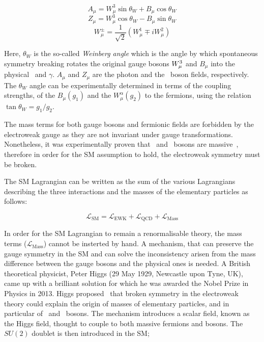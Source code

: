 			\begin{equation}
			\label{eq:photon}
				A_{\mu} = W_{\mu}^3 \sin\theta_W  + B_{\mu}\cos \theta_W 
			\end{equation}
			\begin{equation}
			\label{eq:Zboson}
				Z_{\mu} = W_{\mu}^3\cos\theta_W  - B_{\mu} \sin \theta_W
			\end{equation}
			\begin{equation}
			\label{eq:Wboson}
				W_{\mu}^\pm = \frac{1}{\sqrt{2}} \displaystyle \left ( W_{\mu}^1 \mp i W_{\mu}^2 \right )
			\end{equation}

			\noindent Here, $\theta_W$ is the so-called \emph{Weinberg angle} which is the angle by which spontaneous symmetry breaking rotates the original gauge bosons $W_{\mu}^3$ and $B_{\mu}$ into the physical \Zboson\ and $\gamma$. $A_\mu$ and $Z_\mu$ are the photon and the \Zboson\ boson fields, respectively. The $\theta_W$ angle can be experimentally determined in terms of the coupling strengths, of the $B_{\mu}(g_1)$ and the $W_{\mu}^\alpha (g_2)$ to the fermions, using the relation $\tan\theta_W = g_1 / g_2 $. 

			The mass terms for both gauge bosons and fermionic fields are forbidden by the electroweak gauge as they are not invariant under gauge transformations. Nonetheless, it was experimentally proven that \Wboson\ and \Zboson\ bosons are massive~\cite{Pich2012}, therefore in order for the \ac{SM} assumption to hold, the electroweak symmetry must be broken. 

			The \ac{SM} Lagrangian can be written as the sum of the various Lagrangians describing the three interactions and the masses of the elementary particles as follows:

			\begin{equation}
			\label{eq:SM_Lagrangian}
				\mathcal{L_{\mathrm{SM}}} = \mathcal{L_{\mathrm{EWK}}} + \mathcal{L_{\mathrm{QCD}}} + \mathcal{L_{\mathrm{Mass}}}
			\end{equation}

			\noindent In order for the \ac{SM} Lagrangian to remain a renormalisable theory, the mass terms ($\mathcal{L_{\mathrm{Mass}}}$) cannot be insterted by hand. A mechanism, that can preserve the gauge symmetry in the \ac{SM} and can solve the inconsistency arisen from the mass difference between the gauge bosons and the physical ones is needed. A British theoretical physicist, Peter Higgs (29 May 1929, Newcastle upon Tyne, UK), came up with a brilliant solution for which he was awarded the Nobel Prize in Physics in 2013. Higgs proposed~\cite{Higgs1964} that broken symmetry in the electroweak theory could explain the origin of masses of elementary particles, and in particular of \Wboson\ and \Zboson\ bosons. The mechanism introduces a scalar field, known as the Higgs field, thought to couple to both massive fermions and bosons. The $SU(2)$ doublet is then introduced in the \ac{SM};

